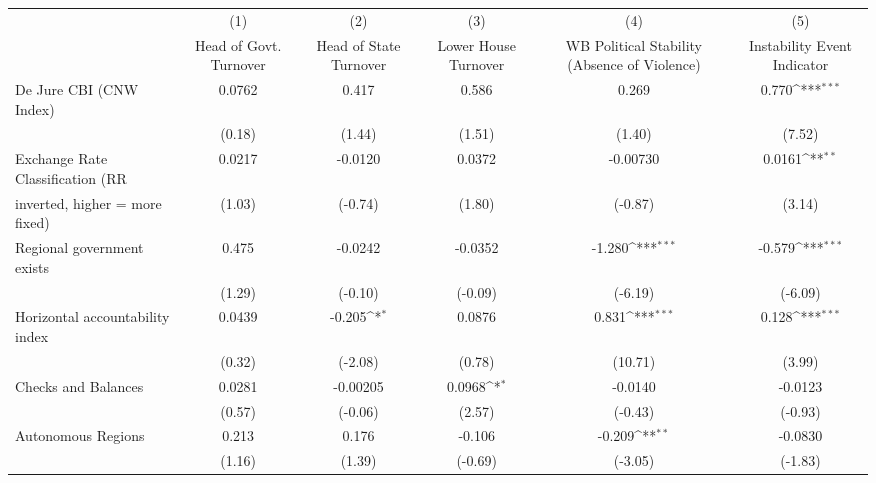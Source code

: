{
\def\sym#1{\ifmmode^{#1}\else\(^{#1}\)\fi}
\begin{tabular}{l*{5}{c}}
\toprule
                                        &\multicolumn{1}{c}{(1)}&\multicolumn{1}{c}{(2)}&\multicolumn{1}{c}{(3)}&\multicolumn{1}{c}{(4)}&\multicolumn{1}{c}{(5)}\\
                                        &\multicolumn{1}{c}{Head of Govt. Turnover}&\multicolumn{1}{c}{Head of State Turnover}&\multicolumn{1}{c}{Lower House Turnover}&\multicolumn{1}{c}{WB Political Stability (Absence of Violence)}&\multicolumn{1}{c}{Instability Event Indicator}\\
\midrule
De Jure CBI (CNW Index)                 &0.0762         &0.417         &0.586         &0.269         &0.770\sym{***}\\
                                        &(0.18)         &(1.44)         &(1.51)         &(1.40)         &(7.52)         \\
\addlinespace
Exchange Rate Classification (RR        &0.0217         &-0.0120         &0.0372         &-0.00730         &0.0161\sym{**} \\
inverted, higher = more fixed)          &(1.03)         &(-0.74)         &(1.80)         &(-0.87)         &(3.14)         \\
\addlinespace
Regional government exists              &0.475         &-0.0242         &-0.0352         &-1.280\sym{***}&-0.579\sym{***}\\
                                        &(1.29)         &(-0.10)         &(-0.09)         &(-6.19)         &(-6.09)         \\
\addlinespace
Horizontal accountability index         &0.0439         &-0.205\sym{*}  &0.0876         &0.831\sym{***}&0.128\sym{***}\\
                                        &(0.32)         &(-2.08)         &(0.78)         &(10.71)         &(3.99)         \\
\addlinespace
Checks and Balances                     &0.0281         &-0.00205         &0.0968\sym{*}  &-0.0140         &-0.0123         \\
                                        &(0.57)         &(-0.06)         &(2.57)         &(-0.43)         &(-0.93)         \\
\addlinespace
Autonomous Regions                      &0.213         &0.176         &-0.106         &-0.209\sym{**} &-0.0830         \\
                                        &(1.16)         &(1.39)         &(-0.69)         &(-3.05)         &(-1.83)         \\

\end{tabular}}
